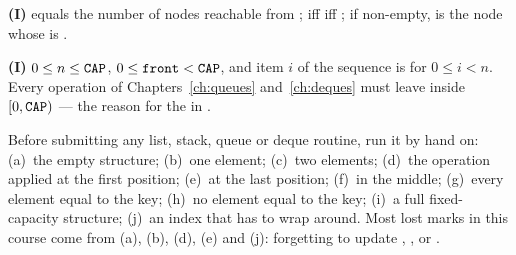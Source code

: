 \begin{example}
\textbf{(I)}  equals the number of nodes reachable from ;
 iff  iff ; if non-empty,  is the
node whose  is .
\end{example}

\begin{example}
\textbf{(I)} $0\le n\le\texttt{CAP}$, $0\le\texttt{front}<\texttt{CAP}$, and item $i$ of the
sequence is  for $0\le i<n$. Every operation of
Chapters~\ref{ch:queues} and~\ref{ch:deques} must leave  inside
$[0,\texttt{CAP})$ --- the reason for the  in .
\end{example}

 Before submitting any list, stack, queue or deque routine,
run it by hand on: (a)~the empty structure; (b)~one element; (c)~two elements; (d)~the
operation applied at the first position; (e)~at the last position; (f)~in the middle;
(g)~every element equal to the key; (h)~no element equal to the key; (i)~a full
fixed-capacity structure; (j)~an index that has to wrap around. Most lost marks in this
course come from (a), (b), (d), (e) and (j): forgetting to update , ,
 or .
